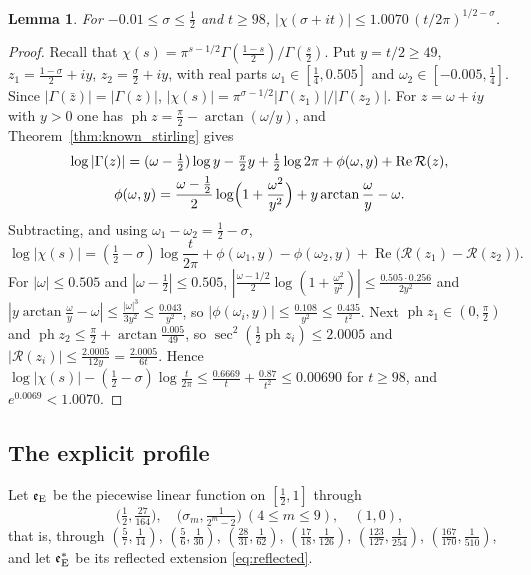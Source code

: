 \documentclass[11pt,a4paper]{article}
\makeatletter
\numberwithin{equation}{section}
\DeclareRobustCommand{\CGref}[1]{\ref{#1}}
\DeclareRobustCommand{\CGeqref}[1]{\eqref{#1}}
\let\CG@origref\ref
\let\CG@origeqref\eqref
\newcommand{\CG@gettip}[1]{\@ifundefined{CGTip@#1}{#1}{\csname CGTip@#1\endcsname}}
\DeclareRobustCommand{\CGref}[1]{\pdftooltip{\CG@origref{#1}}{\CG@gettip{#1}}}
\DeclareRobustCommand{\CGeqref}[1]{\pdftooltip{\CG@origeqref{#1}}{\CG@gettip{#1}}}
\newtheorem{lemma}[theorem]{Lemma}
\theoremstyle{definition}
\theoremstyle{remark}
\newcommand{\eE}{\mathfrak e_{\rm E}}
\makeatother
\begin{document}
\begin{lemma}\label{lem:chi}
For $-0.01\le\sigma\le\frac12$ and $t\ge98$, $|\chi(\sigma+it)|\le1.0070\,(t/2\pi)^{1/2-\sigma}$.
\end{lemma}

\begin{proof}
Recall that $\chi(s)=\pi^{s-1/2}\Gamma(\frac{1-s}2)/\Gamma(\frac s2)$. Put $y=t/2\ge49$, $z_1=\frac{1-\sigma}2+iy$, $z_2=\frac\sigma2+iy$, with real parts $\omega_1\in[\frac14,0.505]$ and $\omega_2\in[-0.005,\frac14]$. Since $|\Gamma(\bar z)|=|\Gamma(z)|$, $|\chi(s)|=\pi^{\sigma-1/2}|\Gamma(z_1)|/|\Gamma(z_2)|$. For $z=\omega+iy$ with $y>0$ one has $\operatorname{ph}z=\frac\pi2-\arctan(\omega/y)$, and Theorem~\CGref{thm:known_stirling} gives
\begin{equation}
\begin{gathered}
\log|\Gamma(z)|=(\omega-\tfrac12)\log y-\tfrac\pi2y+\tfrac12\log2\pi+\phi(\omega,y)+\operatorname{Re}\mathcal R(z),\\
\phi(\omega,y)=\frac{\omega-\frac12}2\log\Bigl(1+\frac{\omega^2}{y^2}\Bigr)+y\arctan\frac\omega y-\omega .
\end{gathered}
\label{eq:stirling_modulus}
\end{equation}
Subtracting, and using $\omega_1-\omega_2=\frac12-\sigma$,
\[
\log|\chi(s)|=(\tfrac12-\sigma)\log\frac t{2\pi}+\phi(\omega_1,y)-\phi(\omega_2,y)+\operatorname{Re}\bigl(\mathcal R(z_1)-\mathcal R(z_2)\bigr).
\]
For $|\omega|\le0.505$ and $|\omega-\frac12|\le0.505$, $|\frac{\omega-1/2}2\log(1+\frac{\omega^2}{y^2})|\le\frac{0.505\cdot0.256}{2y^2}$ and $|y\arctan\frac\omega y-\omega|\le\frac{|\omega|^3}{3y^2}\le\frac{0.043}{y^2}$, so $|\phi(\omega_i,y)|\le\frac{0.108}{y^2}\le\frac{0.435}{t^2}$. Next $\operatorname{ph}z_1\in(0,\frac\pi2)$ and $\operatorname{ph}z_2\le\frac\pi2+\arctan\frac{0.005}{49}$, so $\sec^2(\frac12\operatorname{ph}z_i)\le2.0005$ and $|\mathcal R(z_i)|\le\frac{2.0005}{12y}=\frac{2.0005}{6t}$. Hence $\log|\chi(s)|-(\frac12-\sigma)\log\frac t{2\pi}\le\frac{0.6669}t+\frac{0.87}{t^2}\le0.00690$ for $t\ge98$, and $e^{0.0069}<1.0070$.
\end{proof}

\subsection{The explicit profile}\label{subsec:explicit_profile}
Let $\eE$ be the piecewise linear function on $[\frac12,1]$ through
\begin{equation}
\bigl(\tfrac12,\tfrac{27}{164}\bigr),\quad\bigl(\sigma_m,\tfrac1{2^m-2}\bigr)\ (4\le m\le9),\quad(1,0),
\label{eq:explicit_nodes}
\end{equation}
that is, through $(\frac57,\frac1{14})$, $(\frac56,\frac1{30})$, $(\frac{28}{31},\frac1{62})$, $(\frac{17}{18},\frac1{126})$, $(\frac{123}{127},\frac1{254})$, $(\frac{167}{170},\frac1{510})$, and let $\eE^*$ be its reflected extension \CGeqref{eq:reflected}.
\end{document}
